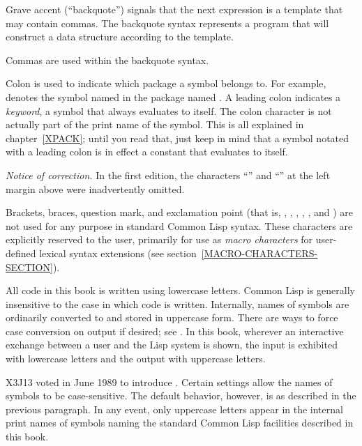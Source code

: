 \begin{indentdesc}{1.2pc}
\item[\cd{{\Xbq}}] Grave accent (``backquote'') signals that
the next expression is a template that may contain commas.  The backquote syntax
represents a program that will construct a data structure
according to the template.

\item[\cd{,}] Commas are used within the backquote syntax.

\item[\cd{:}] Colon is used to indicate which package a
symbol belongs to. For example,  denotes the symbol named
 in the package named .  A leading colon indicates a {\it
keyword}, a symbol that always evaluates to itself.
The colon character is not actually part of the print name
of the symbol.
This is all explained in chapter~\ref{XPACK}; until you read
that, just keep in mind that a symbol notated with a leading colon
is in effect a constant that evaluates to itself.
\end{indentdesc}


\begin{new}%
\emph{Notice of correction.}
In the first edition, the characters ``\cd{,}'' and ``\cd{:}'' at the
left margin above were inadvertently omitted.
\end{new}

Brackets, braces, question mark, and exclamation point
(that is, \cd{{\Xlbracket}}, \cd{{\Xrbracket}}, \cd{{\Xlbrace}}, \cd{{\Xrbrace}},
, and \cd{!}) are not used for any purpose in standard Common Lisp syntax.
These characters are explicitly reserved to the user, primarily
for use as \emph{macro characters} for user-defined lexical syntax extensions
(see section~\ref{MACRO-CHARACTERS-SECTION}).

\begin{obsolete}
All code in this book is written using lowercase letters.
Common Lisp is generally insensitive to the case in which code
is written.  Internally, names of symbols are ordinarily
converted to and stored in uppercase form.
There are ways to force case conversion on output if desired;
see .
In this book, wherever an interactive exchange between a user
and the Lisp system is shown, the input is exhibited with lowercase
letters and the output with uppercase letters.
\end{obsolete}

\begin{newer}
X3J13 voted in June 1989  to introduce
.  Certain settings allow the names of symbols
to be case-sensitive.  The default behavior, however, is as described
in the previous paragraph.  In any event, only uppercase letters
appear in the internal print names of symbols naming the
standard Common Lisp facilities described in this book.
\end{newer}

